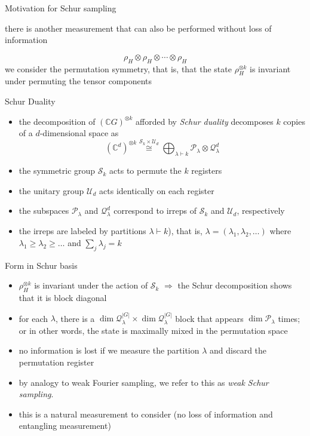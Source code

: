 \documentclass[slideColor]{prosper}
\newcommand{\C}{{\mathbb{C}}}
\newcommand{\cP}{{\mathcal{P}}}
\newcommand{\cQ}{{\mathcal{Q}}}
\newcommand{\cS}{{\mathcal{S}}}
\newcommand{\cU}{{\mathcal{U}}}
\renewcommand{\>}{\rangle}
\newcommand{\<}{\langle}
\newcommand{\partitionof}{\mathbin{\vdash}}
\begin{document}

\begin{slide}{Motivation for Schur sampling}

there is another measurement that can also be performed without loss of information

\[
\rho_H \otimes \rho_H \otimes \cdots \otimes \rho_H
\]
we consider the permutation symmetry, that is, that the state $\rho_H^{\otimes k}$ is invariant under permuting the tensor components

\end{slide}


\begin{slide}{Schur Duality}
\begin{itemize}
\item
the decomposition of $(\C G)^{\otimes k}$ afforded by {\em Schur duality} decomposes $k$ copies of a $d$-dimensional space as 
\[
  (\C^d)^{\otimes k} \stackrel{\cS_k \times \cU_d}{\cong}
  \bigoplus_{\lambda \partitionof k}
  \cP_\lambda \otimes \cQ_\lambda^d
\]
\item the symmetric group $\cS_k$ acts to permute the $k$ registers 
\item the unitary group $\cU_d$ acts identically on each register
\item the subspaces $\cP_\lambda$ and $\cQ_\lambda^d$ correspond to irreps of $\cS_k$ and $\cU_d$, respectively
\item the irreps are labeled by partitions $\lambda \partitionof k$), that is, $\lambda=(\lambda_1,\lambda_2,\ldots)$ where $\lambda_1 \ge \lambda_2 \ge \ldots$ and $\sum_j \lambda_j = k$
\end{itemize}
\end{slide}


\begin{slide}{Form in Schur basis}
\begin{itemize}
\item $\rho_H^{\otimes k}$ is invariant under the action of $\cS_k$ $\Rightarrow$ the Schur decomposition shows that it is block diagonal 
\item for each $\lambda$, there is a $\dim \cQ_\lambda^{|G|} \times \dim \cQ_\lambda^{|G|}$ block that appears $\dim \cP_\lambda$ times; or  in other words, the state is maximally mixed in the permutation space
\item no information is lost if we measure the partition $\lambda$ and discard the permutation register
\item by analogy to weak Fourier sampling, we refer to this as {\em weak Schur sampling}.  
\item this is a natural measurement to consider (no loss of information and entangling measurement)
\end{itemize}
\end{slide}
\end{document}

